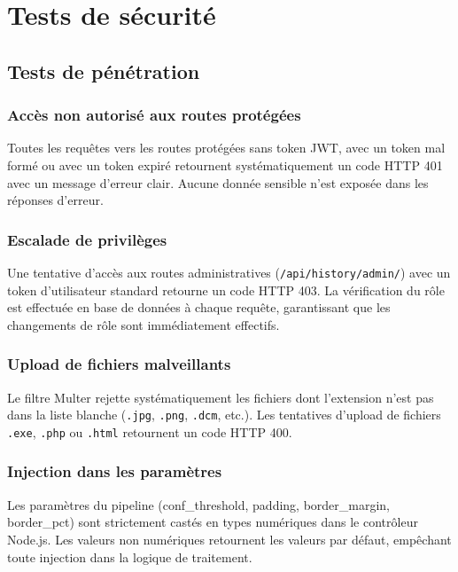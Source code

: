 \section{Tests de sécurité}

\subsection{Tests de pénétration}

\subsubsection{Accès non autorisé aux routes protégées}

Toutes les requêtes vers les routes protégées sans token JWT, avec un token mal formé ou avec un token expiré retournent systématiquement un code HTTP 401 avec un message d'erreur clair. Aucune donnée sensible n'est exposée dans les réponses d'erreur.

\subsubsection{Escalade de privilèges}

Une tentative d'accès aux routes administratives (\texttt{/api/history/admin/}) avec un token d'utilisateur standard retourne un code HTTP 403. La vérification du rôle est effectuée en base de données à chaque requête, garantissant que les changements de rôle sont immédiatement effectifs.

\subsubsection{Upload de fichiers malveillants}

Le filtre Multer rejette systématiquement les fichiers dont l'extension n'est pas dans la liste blanche (\texttt{.jpg}, \texttt{.png}, \texttt{.dcm}, etc.). Les tentatives d'upload de fichiers \texttt{.exe}, \texttt{.php} ou \texttt{.html} retournent un code HTTP 400.

\subsubsection{Injection dans les paramètres}

Les paramètres du pipeline (conf\_threshold, padding, border\_margin, border\_pct) sont strictement castés en types numériques dans le contrôleur Node.js. Les valeurs non numériques retournent les valeurs par défaut, empêchant toute injection dans la logique de traitement.

